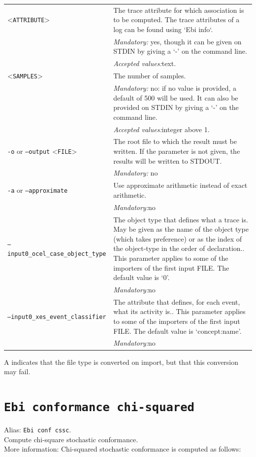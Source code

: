 {\begin{tabularx}{\linewidth}{lX}
<\texttt{ATTRIBUTE}>&The trace attribute for which association is to be computed. The trace attributes of a log can be found using `Ebi info`.\\
&\textit{Mandatory:} \quad yes, though it can be given on STDIN by giving a `-' on the command line.\\
&\textit{Accepted values:}\quad text.\\
<\texttt{SAMPLES}>&The number of samples.\\
&\textit{Mandatory:} \quad no: if no value is provided, a default of 500 will be used. It can also be provided on STDIN by giving a `-' on the command line.\\
&\textit{Accepted values:}\quad integer above 1.\\
\texttt{-o} or \texttt{--output} <\texttt{FILE}> &
The root file to which the result must be written. If the parameter is not given, the results will be written to STDOUT.\\
&\textit{Mandatory:} \quad no\\
\texttt{-a} or \texttt{--approximate} & Use approximate arithmetic instead of exact arithmetic.\\
&\textit{Mandatory:}\quad no\\
\texttt{--input0\_ocel\_case\_object\_type} & The object type that defines what a trace is. May be given as the name of the object type (which takes preference) or as the index of the object-type in the order of declaration.. This parameter applies to some of the importers of the first input FILE. The default value is `0'.\\
&\textit{Mandatory:}\quad no\\
\texttt{--input0\_xes\_event\_classifier} & The attribute that defines, for each event, what its activity is.. This parameter applies to some of the importers of the first input FILE. The default value is `concept:name'.\\
&\textit{Mandatory:}\quad no\\
\bottomrule
\end{tabularx}
A \textdagger{} indicates that the file type is converted on import, but that this conversion may fail.
\clearpage\section{\texttt{Ebi conformance chi-squared}}
\label{command:Ebi conformance chi-squared}
Alias: \texttt{Ebi conf cssc}.\\
Compute chi-square stochastic conformance.\\
More information: Chi-squared stochastic conformance is computed as follows:
        
}
